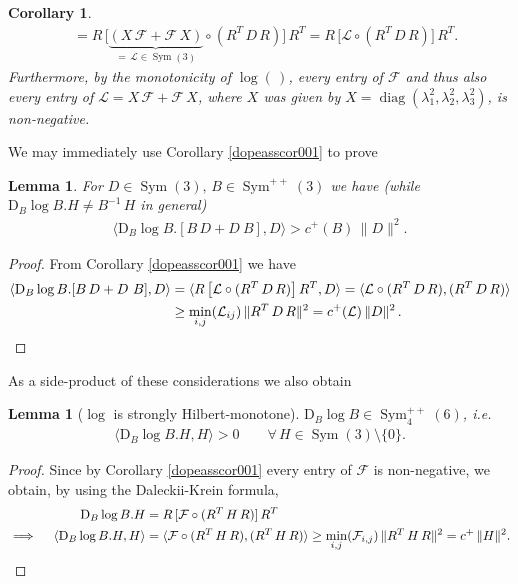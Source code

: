 \documentclass[10pt]{article}
\newcounter{theoremCounter}
\numberwithin{theoremCounter}{section}
\theoremstyle{plain}
\newtheorem{lem}[theoremCounter]{Lemma}
\newtheorem{cor}[theoremCounter]{Corollary}
\theoremstyle{definition}
\newcommand{\norm}[1]{\lVert #1 \rVert}
\newcommand{\DD}{\mathrm{D}}
\DeclareMathOperator{\diag}{diag}
\DeclareMathOperator{\Sym}{Sym}
\numberwithin{equation}{section}
\begin{document}
\begin{appendix}
\begin{cor}
\begin{equation}
\begin{alignedat}{2}
		&= R \, \big[ \underbrace{(X \, \mathcal{F} + \mathcal{F} \, X)}_{= \, \mathcal{L} \in \Sym(3)} \circ (R^T \, D \, R) \big] \, R^T = R \, \big[ \mathcal{L} \circ (R^T \, D \, R) \big] \, R^T.
		\end{alignedat}
		\end{equation}
	Furthermore, by the monotonicity of $\log(\,)$, every entry of $\mathcal{F}$ and thus also every entry of $\mathcal{L} = X \, \mathcal{F} + \mathcal{F} \, X$, where $X$ was given by $X= \diag(\lambda_1^2, \lambda_2^2, \lambda_3^2)$, is non-negative.
	\end{cor}
\noindent We may immediately use Corollary \ref{dopeasscor001} to prove
	\begin{lem}
	\label{dopeasslemma001}
	For $D \in \Sym(3), \, B \in \Sym^{++}(3)$ we have (while $\DD_B \log B. H \neq B^{-1} \, H$ in general)
		\begin{align}
		\langle \DD_B \log B . [B \, D + D \ B] , D \rangle > c^+(B) \, \norm{D}^2.
		\end{align}
	\end{lem}
%
	\begin{proof}
	From Corollary \ref{dopeasscor001} we have
		\begin{align}
		\langle \DD_B \log B . [B \, D + D \ B] , D \rangle &= \langle  R \, \big[ \mathcal{L} \circ (R^T \, D \, R) \big] \, R^T, D \rangle = \langle \mathcal{L} \circ (R^T \, D \, R) , (R^T \, D \, R) \rangle \\
		&\ge \underset{i,j}{\min}(\mathcal{L}_{ij}) \, \norm{R^T \, D \, R}^2 = c^+(\mathcal{L}) \, \norm{D}^2 \, . \notag \qedhere
		\end{align}
	\end{proof}
\noindent As a side-product of these considerations we also obtain
	\begin{lem}	[$\log$ is strongly Hilbert-monotone] \label{lemhilbertmon1}
	$\DD_B \log B \in \Sym^{++}_4(6)$, i.e.
		\begin{align}
		\langle \DD_B \log B . H , H \rangle > 0 \qquad \forall \, H \in \Sym(3) \setminus \{0\}.
		\end{align}
	\end{lem}
%
	\begin{proof} 
	Since by Corollary \ref{dopeasscor001} every entry of $\mathcal{F}$ is non-negative, we obtain, by using the Daleckii-Krein formula,
		\begin{align}
		\DD_B \log B . H &= R \, [\mathcal{F} \circ (R^T \, H \, R)] \, R^T \\
		\implies \quad \langle \DD_B \log B . H , H \rangle &= \langle \mathcal{F} \circ (R^T \, H \, R) , (R^T \, H \, R) \rangle \ge \underset{i,j}{\min}(\mathcal{F}_{i,j}) \, \norm{R^T \, H \, R}^2 = c^+ \, \norm{H}^2. \notag \qedhere

\end{align}
\end{proof}
\end{appendix}
\end{document}
